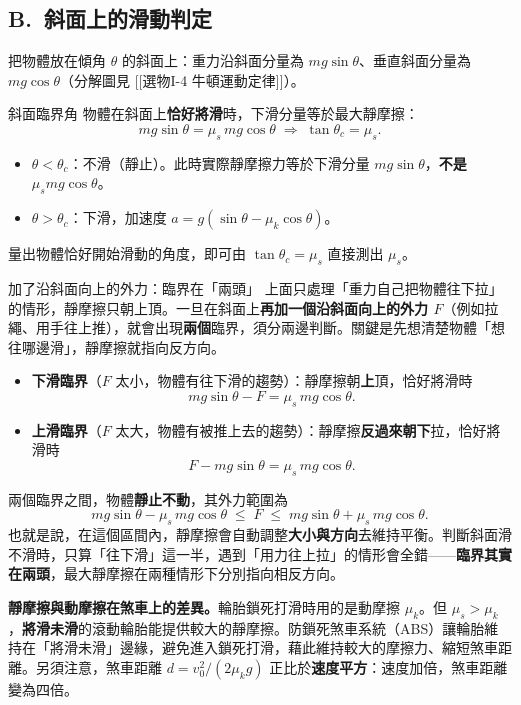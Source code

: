 \documentclass[11pt]{article}
\begin{document}
\subsection*{\sffamily B.\ 斜面上的滑動判定}

把物體放在傾角 $\theta$ 的斜面上：重力沿斜面分量為 $mg\sin\theta$、垂直斜面分量為 $mg\cos\theta$（分解圖見 [[選物I-4 牛頓運動定律]]）。

\begin{補充框}{斜面臨界角}
物體在斜面上\textbf{恰好將滑}時，下滑分量等於最大靜摩擦：
$$ mg\sin\theta = \mu_s\,mg\cos\theta \;\Longrightarrow\; \boxed{\tan\theta_c = \mu_s}. $$
\begin{itemize}\setlength{\itemsep}{1pt}
\item $\theta < \theta_c$：不滑（靜止）。此時實際靜摩擦力等於下滑分量 $mg\sin\theta$，\textbf{不是} $\mu_s mg\cos\theta$。
\item $\theta > \theta_c$：下滑，加速度 $a = g(\sin\theta - \mu_k\cos\theta)$。
\end{itemize}
量出物體恰好開始滑動的角度，即可由 $\tan\theta_c=\mu_s$ 直接測出 $\mu_s$。
\end{補充框}

\begin{補充框}{加了沿斜面向上的外力：臨界在「兩頭」}
上面只處理「重力自己把物體往下拉」的情形，靜摩擦只朝上頂。一旦在斜面上\textbf{再加一個沿斜面向上的外力 $F$}（例如拉繩、用手往上推），就會出現\textbf{兩個}臨界，須分兩邊判斷。關鍵是先想清楚物體「想往哪邊滑」，靜摩擦就指向反方向。

\begin{itemize}\setlength{\itemsep}{1pt}
\item \textbf{下滑臨界}（$F$ 太小，物體有往下滑的趨勢）：靜摩擦朝\textbf{上}頂，恰好將滑時
$$mg\sin\theta - F = \mu_s\,mg\cos\theta.$$
\item \textbf{上滑臨界}（$F$ 太大，物體有被推上去的趨勢）：靜摩擦\textbf{反過來朝下}拉，恰好將滑時
$$F - mg\sin\theta = \mu_s\,mg\cos\theta.$$
\end{itemize}

兩個臨界之間，物體\textbf{靜止不動}，其外力範圍為
$$mg\sin\theta-\mu_s\,mg\cos\theta \;\le\; F \;\le\; mg\sin\theta+\mu_s\,mg\cos\theta.$$
也就是說，在這個區間內，靜摩擦會自動調整\textbf{大小與方向}去維持平衡。判斷斜面滑不滑時，只算「往下滑」這一半，遇到「用力往上拉」的情形會全錯——\textbf{臨界其實在兩頭}，最大靜摩擦在兩種情形下分別指向相反方向。
\end{補充框}

\textbf{靜摩擦與動摩擦在煞車上的差異。}輪胎鎖死打滑時用的是動摩擦 $\mu_k$。但 $\mu_s > \mu_k$，\textbf{將滑未滑}的滾動輪胎能提供較大的靜摩擦。防鎖死煞車系統（ABS）讓輪胎維持在「將滑未滑」邊緣，避免進入鎖死打滑，藉此維持較大的摩擦力、縮短煞車距離。另須注意，煞車距離 $d=v_0^2/(2\mu_k g)$ 正比於\textbf{速度平方}：速度加倍，煞車距離變為四倍。
\end{document}
